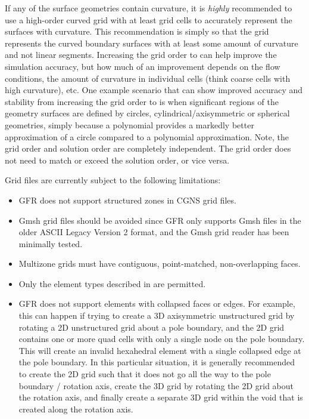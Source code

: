 If any of the surface geometries contain curvature, it is \emph{highly}
recommended to use a high-order curved grid with at least \PO[2] grid cells to
accurately represent the surfaces with curvature.
%
This recommendation is simply so that the grid represents the curved boundary
surfaces with at least some amount of curvature and not linear segments.
%
Increasing the grid order to \PO[3+] can help improve the simulation accuracy,
but how much of an improvement depends on the flow conditions, the amount of
curvature in individual cells (think coarse cells with high curvature), etc.
%
One example scenario that can show improved accuracy and stability from
increasing the grid order to \PO[3+] is when significant regions of the geometry
surfaces are defined by circles, \thatis cylindrical\slash axisymmetric or
spherical geometries, simply because a \PO[3+] polynomial provides a markedly
better approximation of a circle compared to a \PO[2] polynomial approximation.
%
Note, the grid order and solution order are completely independent.
%
The grid order does not need to match or exceed the solution order, or vice
versa.


Grid files are currently subject to the following limitations:
%
\begin{itemize}
  \item
    GFR does not support structured zones in CGNS grid files.
  \item
    Gmsh grid files should be avoided since GFR only supports Gmsh files in the
    older ASCII Legacy Version 2 format, and the Gmsh grid reader has been
    minimally tested.
  \item
    Multizone grids must have contiguous, point-matched, non-overlapping faces.
  \item
    Only the element types described in  are permitted.
  \item
    GFR does not support elements with collapsed faces or edges. 
    For example, this can happen if trying to create a 3D axisymmetric
    unstructured grid by rotating a 2D unstructured grid about a pole boundary,
    and the 2D grid contains one or more quad cells with only a single node on
    the pole boundary.
    This will create an invalid hexahedral element with a single collapsed edge
    at the pole boundary.
    In this particular situation, it is generally recommended to create the 2D
    grid such that it does not go all the way to the pole boundary \slash
    rotation axis, create the 3D grid by rotating the 2D grid about the rotation
    axis, and finally create a separate 3D grid within the void that is created
    along the rotation axis.
\end{itemize}

